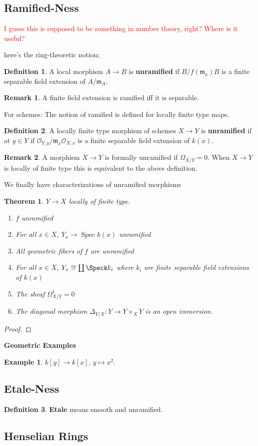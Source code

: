 \documentclass[english]{amsart}
\newcommand{\Spec}{\operatorname{Spec}}
\newcommand{\mf}{\mathfrak}
\newcommand{\mc}{\mathcal}
\newcommand{\ques}[1]{\textcolor{red}{#1}}
\newtheorem*{thm}{Theorem}
\theoremstyle{definition}
\newtheorem*{defn}{Definition}
\newtheorem*{example}{Example}
\newtheorem*{rmk}{Remark}
\begin{document}
\subsection{Ramified-Ness}

\ques{I guess this is supposed to be something in number theory, right? Where is it useful? }

here's the ring-theoretic notion;

\begin{defn}
A local morphism $A \to B$ is \textbf{unramified} if $B/f(\mf{m}_a) B$ is a finite separable field extension of $A/\mf{m}_A$. 
\end{defn}

\begin{rmk}
A finite field extension is ramified iff it is separable. 
\end{rmk}


For schemes: The notion of ramified is defined for locally finite type maps. 

\begin{defn}
A locally finite type morphism of schemes $X \to Y$ is \textbf{unramified} if at $y \in Y$ if $\mc{O}_{Y,y}/ \mf{m}_x \mc{O}_{X,x}$ is a finite separable field extension of $k(x)$. 
\end{defn}

\begin{rmk}
A morphism $X \to Y$ is formally unramified if $\Omega_{X/Y} = 0$. When $X \to Y$ is locally of finite type this is equivalent to the above definition. 
\end{rmk}

We finally have characterizations of unramified morphisms

\begin{thm}
$Y \to X$ locally of finite type. 
\begin{enumerate}
\item $f$ unramified
\item For all $x \in X$, $Y_x \to \Spec k(x)$ unramified
\item All geometric fibers of $f$ are unramified
\item For all $x \in X$, $Y_x \cong \coprod \Speck k_i$ where $k_i$ are finite separable field extensions of $k(x)$
\item The sheaf $\Omega^1_{X/Y} = 0$
\item The diagonal morphism $\Delta_{Y/X} : Y \to Y \times_X Y$ is an open immersion. 
\end{enumerate}
\end{thm}
\begin{proof}

\end{proof}

\textbf{Geometric Examples}

\begin{example}
$k[y] \to k[x]$, $y \mapsto x^2$. 
\end{example}



\subsection{Etale-Ness}

\begin{defn}
\textbf{Etale} means smooth and unramified. 
\end{defn}

\subsection{Henselian Rings}
\end{document}
